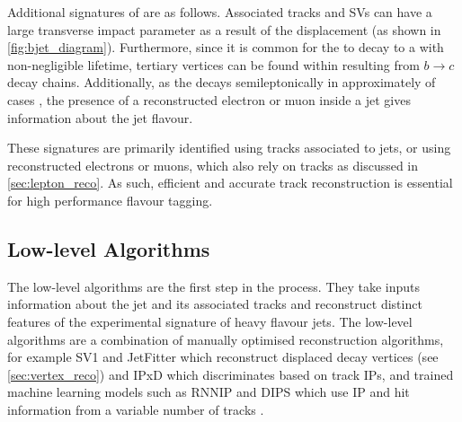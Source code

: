 Additional signatures of \bhadrons are as follows.
Associated tracks and SVs can have a large transverse impact parameter \dzero as a result of the \bhadron displacement (as shown in \cref{fig:bjet_diagram}).
Furthermore, since it is common for the \bhadron to decay to a \chadron with non-negligible lifetime, tertiary vertices can be found within \bjets resulting from $b \rightarrow c$ decay chains.
Additionally, as the \borchadron decays semileptonically in approximately  of cases \cite{Workman:2022ynf}, the presence of a reconstructed electron or muon inside a jet gives information about the jet flavour.

These signatures are primarily identified using tracks associated to jets, or using reconstructed electrons or muons, which also rely on tracks as discussed in \cref{sec:lepton_reco}.
As such, efficient and accurate track reconstruction is essential for high performance flavour tagging.



\subsection{Low-level Algorithms}\label{sec:low_level_algs}

The low-level algorithms are the first step in the \btagging process.
They take inputs information about the jet and its associated tracks and reconstruct distinct features of the experimental signature of heavy flavour jets.
The low-level algorithms are a combination of manually optimised reconstruction algorithms, for example SV1 and JetFitter which reconstruct displaced decay vertices (see \cref{sec:vertex_reco}) and IPxD which discriminates based on track IPs, and trained machine learning models such as RNNIP and DIPS which use IP and hit information from a variable number of tracks \cite{ATL-PHYS-PUB-2017-003,ATL-PHYS-PUB-2020-014}.

